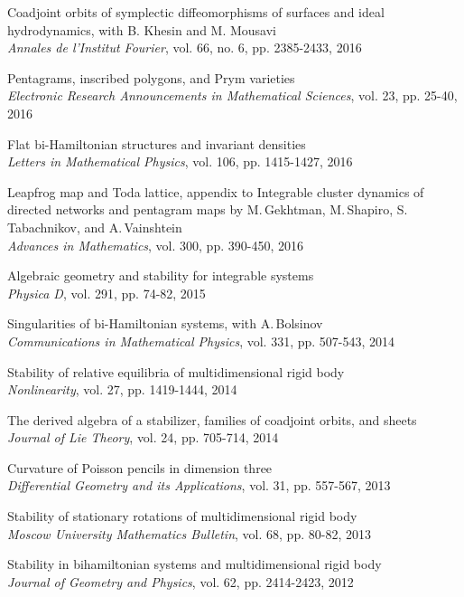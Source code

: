 \documentclass[a4paper, 12pt]{article}
\begin{document}
\begin{compactenum}
\item {Coadjoint orbits of symplectic diffeomorphisms of surfaces and ideal hydrodynamics}, with
B. Khesin and M. Mousavi\\\textit{Annales de l'Institut Fourier}, vol. 66, no. 6, pp. 2385-2433, 2016
\item {Pentagrams, inscribed polygons, and Prym varieties}\\\textit{Electronic Research Announcements in
Mathematical Sciences}, vol. 23, pp. 25-40, 2016
\item {{Flat bi-Hamiltonian structures and invariant densities}}\\\textit{Letters in Mathematical Physics},  vol. 106, pp. 1415-1427, 2016
\item {{Leapfrog map and Toda lattice}}, appendix to {{Integrable cluster dynamics of directed networks and pentagram maps}} by M.\,Gekhtman, M.\,Shapiro, S.\,Tabachnikov,  and A.\,Vainshtein\\\textit{Advances in Mathematics}, vol. 300, pp. 390-450, 2016
\item {{Algebraic geometry and stability for integrable systems}}\\\textit{Physica D}, {vol. 291}, pp. 74-82, 2015
\item {{Singularities of bi-Hamiltonian systems}}, with A.\,Bolsinov \\
\textit{Communications in Mathematical Physics}, {vol. 331}, pp. 507-543, 2014
\item {{Stability of relative equilibria of multidimensional rigid body}}\\\textit{Nonlinearity}, vol. 27, pp. 1419-1444, 2014
\item {{The derived algebra of a stabilizer, families of coadjoint orbits, and sheets}}\\\textit{Journal of Lie Theory}, {vol. 24}, pp. 705-714, 2014
\item {{Curvature of Poisson pencils in dimension three}}\\\textit{Differential Geometry and its Applications}, {vol. 31}, pp. 557-567, 2013
\item {{Stability of stationary rotations of multidimensional rigid body}}\\\textit{Moscow University Mathematics Bulletin}, {vol. 68}, pp. 80-82, 2013
\item {{Stability in bihamiltonian systems and
multidimensional rigid body}}\\\textit{Journal of Geometry and Physics}, {vol. 62}, pp. 2414-2423, 2012

\end{compactenum}
\end{document}
